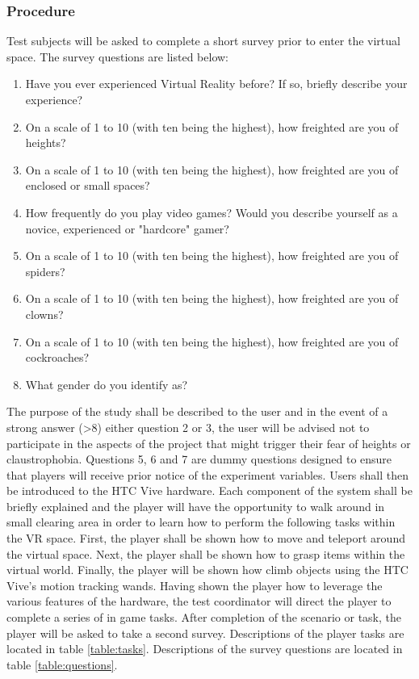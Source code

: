 \subsubsection{Procedure}
Test subjects will be asked to complete a short survey prior to enter the virtual space. The survey questions are listed below: \begin{enumerate}
	\item Have you ever experienced Virtual Reality before? If so, briefly describe your experience?
	\item On a scale of 1 to 10 (with ten being the highest), how freighted are you of heights? 
		\item On a scale of 1 to 10 (with ten being the highest), how freighted are you of enclosed or small spaces?
	\item How frequently do you play video games? Would you describe yourself as a novice, experienced or "hardcore" gamer? 
	\item  On a scale of 1 to 10 (with ten being the highest), how freighted are you of spiders?
		\item  On a scale of 1 to 10 (with ten being the highest), how freighted are you of clowns?
			\item  On a scale of 1 to 10 (with ten being the highest), how freighted are you of cockroaches?
\item What gender do you identify as?
\end{enumerate}
The purpose of the study shall be described to the user and in the event of a strong answer (>8) either question 2 or 3, the user will be advised not to participate in the aspects of the project that might trigger their fear of heights or claustrophobia. Questions 5, 6 and 7 are dummy questions designed to ensure that players will receive prior notice of the experiment variables.  Users shall then be introduced to the HTC Vive hardware. Each component of the system shall be briefly explained and the player will have the opportunity to walk around in small clearing area in order to learn how to perform the following tasks within the VR space. First, the player shall be shown how to move and teleport around the virtual space. Next, the player shall be shown how to grasp items within the virtual world. Finally, the player will be shown how climb objects using the HTC Vive's motion tracking wands. Having shown the player how to leverage the various features of the hardware, the test coordinator will direct the player to complete a series of in game tasks. After completion of the scenario or task, the player will be asked to take a second survey. Descriptions of the player tasks are located in table \ref{table:tasks}. Descriptions of the survey questions are located in table \ref{table:questions}.

